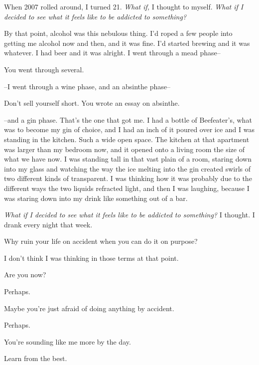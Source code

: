 \label{ally:5}
\begin{paracol}{2}
  \begin{leftcolumn}

\noindent When 2007 rolled around, I turned 21. \emph{What if,} I thought to myself. \emph{What if I decided to see what it feels like to be addicted to something?}

By that point, alcohol was this nebulous thing. I'd roped a few people into getting me alcohol now and then, and it was fine. I'd started brewing and it was whatever. I had beer and it was alright. I went through a mead phase--

\begin{ally}
You went through several.
\end{ally}
--I went through a wine phase, and an absinthe phase--

\begin{ally}
Don't sell yourself short. You wrote an essay on absinthe.
\end{ally}
--and a gin phase. That's the one that got me. I had a bottle of Beefeater's, what was to become my gin of choice, and I had an inch of it poured over ice and I was standing in the kitchen. Such a wide open space. The kitchen at that apartment was larger than my bedroom now, and it opened onto a living room the size of what we have now. I was standing tall in that vast plain of a room, staring down into my glass and watching the way the ice melting into the gin created swirls of two different kinds of transparent. I was thinking how it was probably due to the different ways the two liquids refracted light, and then I was laughing, because I was staring down into my drink like something out of a bar.

\emph{What if I decided to see what it feels like to be addicted to something?} I thought. I drank every night that week.

\begin{ally}
Why ruin your life on accident when you can do it on purpose?
\end{ally}
I don't think I was thinking in those terms at that point.

\begin{ally}
Are you now?
\end{ally}
Perhaps.

\begin{ally}
Maybe you're just afraid of doing anything by accident.
\end{ally}
Perhaps.

\begin{ally}
You're sounding like me more by the day.
\end{ally}
Learn from the best.


\end{leftcolumn}
\end{paracol}
